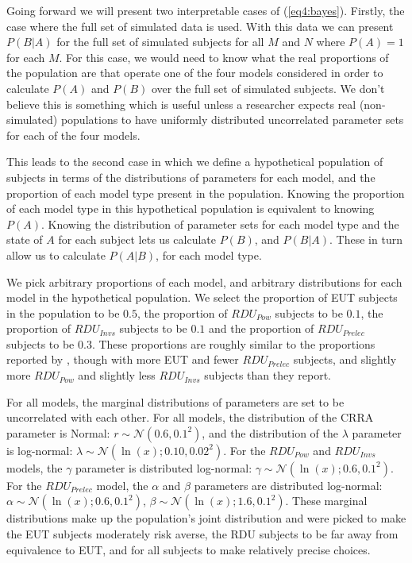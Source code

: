 \documentclass[11pt,a4paper]{report}
\begin{document}
Going forward we will present two interpretable cases of (\ref{eq4:bayes}).
Firstly, the case where the full set of simulated data is used.
With this data we can present $P(B|A)$ for the full set of simulated subjects for all $M$ and $N$ where $P(A) = 1$ for each $M$.
For this case, we would need to know what the real proportions of the population are that operate one of the four models considered in order to calculate $P(A)$ and $P(B)$ over the full set of simulated subjects.
We don't believe this is something which is useful unless a researcher expects real (non-simulated) populations to have uniformly distributed uncorrelated parameter sets for each of the four models.

This leads to the second case in which we define a hypothetical population of subjects in terms of the distributions of parameters for each model, and the proportion of each model type present in the population.
Knowing the proportion of each model type in this hypothetical population is equivalent to knowing $P(A)$.
Knowing the distribution of parameter sets for each model type and the state of $A$ for each subject lets us calculate $P(B)$, and $P(B|A)$.
These in turn allow us to calculate $P(A|B)$, for each model type.

We pick arbitrary proportions of each model, and arbitrary distributions for each model in the hypothetical population.
We select the proportion of EUT subjects in the population to be $0.5$, the proportion of $\mathit{RDU_{Pow}}$ subjects to be $0.1$, the proportion of $\mathit{RDU_{Invs}}$ subjects to be $0.1$ and the proportion of $\mathit{RDU_{Prelec}}$ subjects to be $0.3$.
These proportions are roughly similar to the proportions reported by \textcite[108]{Harrison2016}, though with more EUT and fewer $\mathit{RDU_{Prelec}}$ subjects, and slightly more $\mathit{RDU_{Pow}}$ and slightly less $\mathit{RDU_{Invs}}$ subjects than they report.

For all models, the marginal distributions of parameters are set to be uncorrelated with each other.
For all models, the distribution of the CRRA parameter is Normal: $r \sim \mathcal{N}(0.6, 0.1^2)$, and the distribution of the $\lambda$ parameter is log-normal: $\lambda \sim \mathcal{N}(\ln(x);0.10, 0.02^2)$.
For the $\mathit{RDU_{Pow}}$ and $\mathit{RDU_{Invs}}$ models, the $\gamma$ parameter is distributed log-normal: $\gamma \sim \mathcal{N}(\ln(x);0.6, 0.1^2)$.
For the $\mathit{RDU_{Prelec}}$ model, the $\alpha$ and $\beta$ parameters are distributed log-normal: $\alpha \sim \mathcal{N}(\ln(x);0.6, 0.1^2)$, $\beta \sim \mathcal{N}(\ln(x);1.6, 0.1^2)$.
These marginal distributions make up the population's joint distribution and were picked to make the EUT subjects moderately risk averse, the RDU subjects to be far away from equivalence to EUT, and for all subjects to make relatively precise choices.
\end{document}
